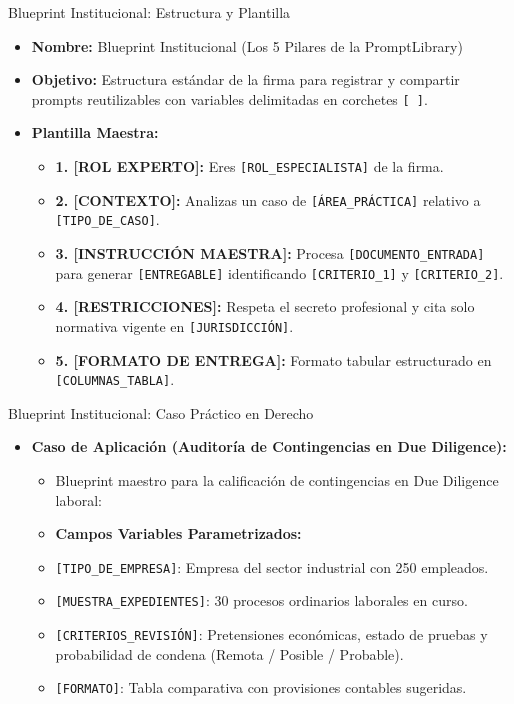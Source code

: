 \documentclass[aspectratio=169]{beamer}
\begin{document}
\begin{frame}{Blueprint Institucional: Estructura y Plantilla}


\begin{itemize}
  \item \textbf{Nombre:} Blueprint Institucional (Los 5 Pilares de la PromptLibrary)
  \item \textbf{Objetivo:} Estructura estándar de la firma para registrar y compartir prompts reutilizables con variables delimitadas en corchetes \texttt{[ ]}.
  \item \textbf{Plantilla Maestra:}
  \begin{itemize}
    \item \textbf{1. [ROL EXPERTO]:} Eres \texttt{[ROL\_ESPECIALISTA]} de la firma.
    \item \textbf{2. [CONTEXTO]:} Analizas un caso de \texttt{[ÁREA\_PRÁCTICA]} relativo a \texttt{[TIPO\_DE\_CASO]}.
    \item \textbf{3. [INSTRUCCIÓN MAESTRA]:} Procesa \texttt{[DOCUMENTO\_ENTRADA]} para generar \texttt{[ENTREGABLE]} identificando \texttt{[CRITERIO\_1]} y \texttt{[CRITERIO\_2]}.
    \item \textbf{4. [RESTRICCIONES]:} Respeta el secreto profesional y cita solo normativa vigente en \texttt{[JURISDICCIÓN]}.
    \item \textbf{5. [FORMATO DE ENTREGA]:} Formato tabular estructurado en \texttt{[COLUMNAS\_TABLA]}.
  \end{itemize}
\end{itemize}
\end{frame}

\begin{frame}{Blueprint Institucional: Caso Práctico en Derecho}


\begin{itemize}
  \item \textbf{Caso de Aplicación (Auditoría de Contingencias en Due Diligence):}
  \begin{itemize}
    \item Blueprint maestro para la calificación de contingencias en Due Diligence laboral:
    \item \textbf{Campos Variables Parametrizados:}
    \item \texttt{[TIPO\_DE\_EMPRESA]}: Empresa del sector industrial con 250 empleados.
    \item \texttt{[MUESTRA\_EXPEDIENTES]}: 30 procesos ordinarios laborales en curso.
    \item \texttt{[CRITERIOS\_REVISIÓN]}: Pretensiones económicas, estado de pruebas y probabilidad de condena (Remota / Posible / Probable).
    \item \texttt{[FORMATO]}: Tabla comparativa con provisiones contables sugeridas.
  \end{itemize}
\end{itemize}
\end{frame}
\end{document}
